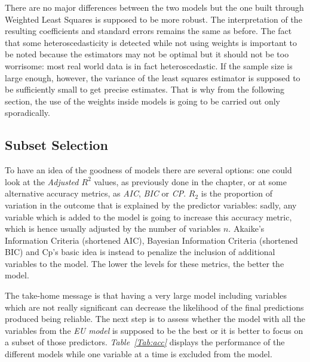 \documentclass[a4paper,12pt]{book}
\begin{document}
There are no major differences between the two models but the one built through Weighted Least Squares is supposed to be more robust. The interpretation of the resulting coefficients and standard errors remains the same as before. The fact that some heteroscedasticity is detected while not using weights is important to be noted because the estimators may not be optimal but it should not be too worrisome: most real world data is in fact heteroscedastic. If the sample size is large enough, however, the variance of the least squares estimator is supposed to be sufficiently small to get precise estimates. That is why from the following section, the use of the weights inside models is going to be carried out only sporadically.

\subsection{Subset Selection}

To have an idea of the goodness of models there are several options: one could look at the \textit{Adjusted $R^{2}$} values, as previously done in the chapter, or at some alternative accuracy metrics, as \textit{AIC}, \textit{BIC} or \textit{CP}. $R_2$ is the proportion of variation in the outcome that is explained by the predictor variables: sadly, any variable which is added to the model is going to increase this accuracy metric, which is hence usually adjusted by the number of variables $n$. Akaike's Information Criteria (shortened AIC), Bayesian Information Criteria (shortened BIC) and Cp's basic idea is instead to penalize the inclusion of additional variables to the model. The lower the levels for these metrics, the better the model.

The take-home message is that having a very large model including variables which are not really significant can decrease the likelihood of the final predictions produced being reliable. The next step is to assess whether the model with all the variables from the \textit{EU model} is supposed to be the best or it is better to focus on a subset of those predictors. \textit{Table~\ref{Tab:acc}} displays the performance of the different models while one variable at a time is excluded from the model.
\end{document}

